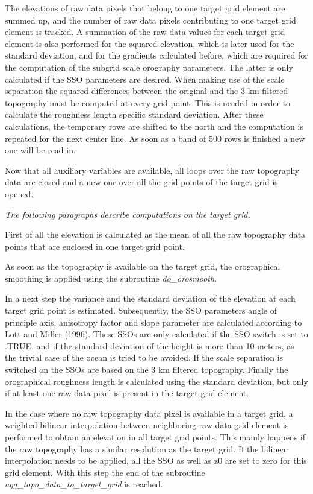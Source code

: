 \documentclass[a4paper,10pt,DIV14,BCOR1cm,titlepage,twoside]{scrartcl}
\begin{document}
The elevations of raw data pixels that belong to one target grid element are summed up, and the number of raw data pixels contributing to one target grid element is tracked. A summation of the raw data values for each target grid element is also performed for the squared elevation, which is later used for the standard deviation, and for the gradients calculated before, which are required for the computation of the subgrid scale orography parameters. The latter is only calculated if the SSO parameters are desired. When making use of the scale separation the squared differences between the original and the 3 km filtered topography must be computed at every grid point. This is needed in order to calculate the roughness length specific standard deviation. After these calculations, the temporary rows are shifted to the north and the computation is repeated for the next center line. As soon as a band of 500 rows is finished a new one will be read in.\par\medskip\noindent
Now that all auxiliary variables are available, all loops over the raw topography data are closed and a new one over all the grid points of the target grid is opened. \par\medskip\noindent
\textit{The following paragraphs describe computations on the target grid.}\par\medskip\noindent
First of all the elevation is calculated as the mean of all the raw topography data points that are enclosed in one target grid point.\par\medskip\noindent
As soon as the topography is available on the target grid, the orographical smoothing is applied using the subroutine \textit{do\_orosmooth}.\par\medskip\noindent
In a next step the variance and the standard deviation of the elevation at each target grid point is estimated. Subsequently, the SSO parameters angle of principle axis, anisotropy factor and slope parameter are calculated according to Lott and Miller (1996). These SSOs are only calculated if the SSO switch is set to .TRUE. and if the standard deviation of the height is more than 10 meters, as the trivial case of the ocean is tried to be avoided. If the scale separation is switched on the SSOs are based on the 3 km filtered topography. Finally the orographical roughness length is calculated using the standard deviation, but only if at least one raw data pixel is present in the target grid element.\par\medskip\noindent
In the case where no raw topography data pixel is available in a target grid, a weighted bilinear interpolation between neighboring raw data grid element is performed to obtain an elevation in all target grid points. This mainly happens if the raw topography has a similar resolution as the target grid. If the bilinear interpolation needs to be applied, all the SSO as well as z0 are set to zero for this grid element. With this step the end of the subroutine \textit{agg\_topo\_data\_to\_target\_grid} is reached.\par\medskip\noindent
\end{document}
